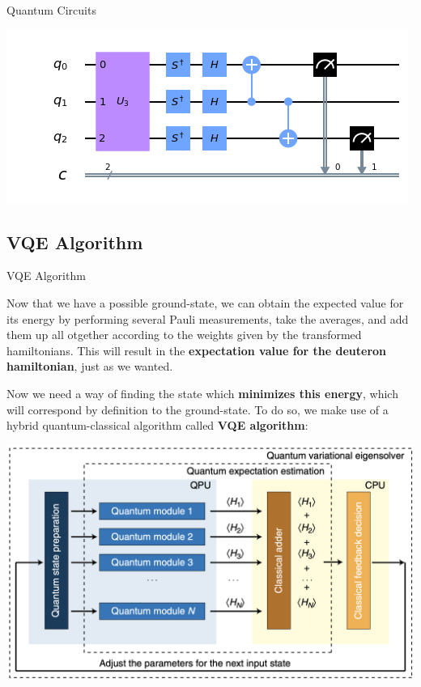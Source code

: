 \documentclass[9pt, handout, aspectratio=169]{beamer}		%
\begin{document}
\begin{frame}{Quantum Circuits}
\begin{multicols}{2}
			\columnbreak

			\begin{center}
				\includegraphics[height=.24\paperheight]{Figures/u3_measure}
			\end{center}

		\end{multicols}

	\end{frame}


	\subsection{VQE Algorithm}

	\begin{frame}{VQE Algorithm}

		Now that we have a possible ground-state, we can obtain the expected value for its energy by performing several Pauli measurements, take the averages, and add them up all otgether according to the weights given by the transformed hamiltonians. This will result in the \textbf{expectation value for the deuteron hamiltonian}, just as we wanted.

		\medskip

		Now we need a way of finding the state which \textbf{minimizes this energy}, which will correspond by definition to the ground-state. To do so, we make use of a hybrid quantum-classical algorithm called \textbf{VQE algorithm}:

		\begin{center}
			\includegraphics[height=.44\paperheight]{Figures/vqe_algorithm}
		\end{center}

	\end{frame}
\end{document}

